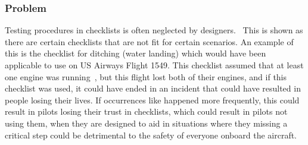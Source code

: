 \documentclass[a4paper, british]{article}
\newcommand{\lfcomment}[1]{\textcolor{blue}{\textbf{LF}:~#1}}
\renewcommand{\lfcomment}[1]{\relax}
\begin{document}
\subsubsection*{Problem}

Testing procedures in checklists is often neglected by designers.~\cite{nasa-design}
This is shown as there are certain checklists that are not fit for 
certain scenarios. An example of this is the checklist for ditching (water landing)
which would have been applicable to use on US Airways Flight 1549. This checklist 
assumed that at least one engine was running~\cite{AWE1549}, but this flight lost 
both of their engines, and if this checklist was used, it could have ended in 
an incident that could have resulted in people losing their lives.
If occurrences like happened more frequently, this could result in 
pilots losing their trust in checklists, which could result in pilots 
not using them, when they are designed to aid in situations where
they missing a critical step could be detrimental to the safety of 
everyone onboard the aircraft.~\cite{manifesto}
\end{document}
